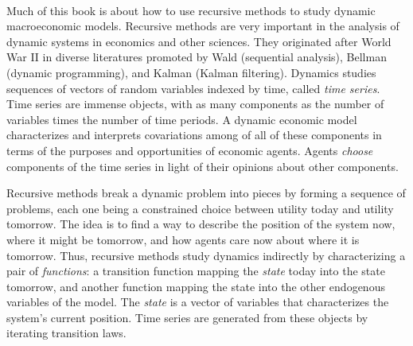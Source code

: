 
\


{}
\noindent Much of this book is about how to use recursive methods to study dynamic
macro\-economic models. Recursive methods are very important in the
analysis of dynamic systems in economics and other sciences. They
originated after World War II in diverse literatures promoted by
Wald (sequential analysis), Bellman (dynamic programming), and
Kalman (Kalman filtering).   
\noindent Dynamics studies sequences  of vectors of random variables
indexed by time, called {\it time series}.     Time series
are immense objects, with as many components as the
number  of variables times the number of time periods.
A dynamic economic
model  characterizes and
interprets covariations  among   of all of these components
in terms of the purposes and opportunities  of economic agents.
Agents {\it choose\/} components of the time series in light
of their opinions about other components.

Recursive methods   break a dynamic problem
into pieces by forming a sequence  of problems, each one
being a constrained choice between utility today and utility  tomorrow.
The idea is to find a way to describe the position
of the system now, where it might be tomorrow, and
how agents care now about where  it is tomorrow. Thus,
recursive methods study dynamics indirectly by characterizing a pair
of {\it functions}: a transition function mapping the {\it state} today into the state tomorrow,
 and another function mapping the state into
the other endogenous variables of the model.
The {\it state\/} is a vector of variables that characterizes
the system's current position.  Time series
are generated from these objects
by iterating  transition laws.


